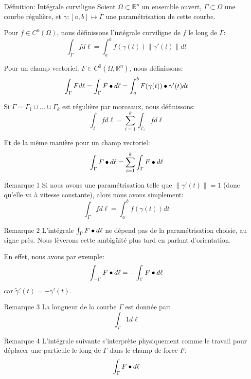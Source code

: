 \documentclass[a4paper]{article}
\begin{document}
\begin{parag}{Définition: Intégrale curviligne}
    Soient $\Omega \subset \mathbb{R}^n$ un ensemble ouvert, $\Gamma \subset \Omega$ une courbe régulière, et $\gamma : \left[a, b\right] \mapsto \Gamma$ une paramétrisation de cette courbe.

    Pour $f \in C^0\left(\Omega\right)$, nous définissons l'intégrale curviligne de $f$ le long de $\Gamma$:
    \[\int_\Gamma f d \ell = \int_{a}^{b} f\left(\gamma\left(t\right)\right) \left\|\gamma'\left(t\right)\right\| dt\]
    
    Pour un champ vectoriel, $F \in C^0\left(\Omega, \mathbb{R}^n\right)$, nous définissons: 
    \[\int_{\Gamma} F d \ell = \int_\Gamma F \dotprod d \ell = \int_{a}^{b} F\left(\gamma\left(t\right)\right) \dotprod \gamma'\left(t\right) dt\]
    
    Si $\Gamma = \Gamma_1 \cup \ldots \cup \Gamma_k$ est régulière par morceaux, nous définissons: 
    \[\int_{\Gamma} f d \ell = \sum_{i=1}^{k} \int_{\Gamma_{i}} f d \ell \]

    Et de la même manière pour un champ vectoriel:
    \[\int_{\Gamma} F \bullet d \ell = \sum_{i=1}^{k} \int_{\Gamma} F \bullet d \ell \]

    \begin{subparag}{Remarque 1}
        Si nous avons une paramétrisation telle que $\left\|\gamma'\left(t\right)\right\| = 1$ (donc qu'elle va à vitesse constante), alors nous avons simplement: 
        \[\int_{\Gamma} f d \ell = \int_{a}^{b} f\left(\gamma\left(t\right)\right) dt\]
    \end{subparag}

    \begin{subparag}{Remarque 2}
        L'intégrale $\int_{\Gamma} F \bullet d \ell $ ne dépend pas de la paramétrisation choisie, au signe près. Nous lèverons cette ambigüité plus tard en parlant d'orientation.

        En effet, nous avons par exemple:
        \[\int_{-\Gamma} F \bullet d \ell = -\int_{\Gamma} F \bullet d \ell \]
        car $\widetilde{\gamma}'\left(t\right) = -\gamma'\left(t\right)$.
    \end{subparag}
    
    \begin{subparag}{Remarque 3}
        La longueur de la courbe $\Gamma$ est donnée par: 
        \[\int_\Gamma 1 d \ell\]
    \end{subparag}
    
    \begin{subparag}{Remarque 4}
        L'intégrale suivante s'interprète physiquement comme le travail pour déplacer une particule le long de $\Gamma$ dans le champ de force $F$: 
        \[\int_{\Gamma} F \bullet d \ell \]
        
    \end{subparag}
\end{parag}
\end{document}
